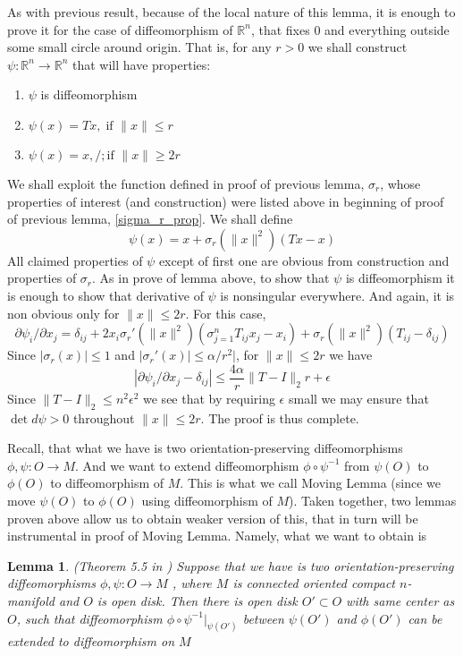 \documentclass[8pt]{article} %
\newcommand{\norm}[1]{\|#1\|}
\newtheorem{lemma}[theorem]{Lemma}
\newenvironment{proof}[1][Proof]{\begin{trivlist}
\item[\hskip \labelsep {\bfseries #1}]}{\qed\end{trivlist}}
\newcommand{\qed}{\nobreak \ifvmode \relax \else
\ifdim\lastskip<1.5em \hskip-\lastskip
\hskip1.5em plus0em minus0.5em \fi \nobreak
  \vrule height0.75em width0.5em depth0.25em\fi}
\begin{document}
\begin{proof}
	As with previous result, because of the local nature of this lemma, it is enough to prove it for the case of diffeomorphism of
	$\mathbb{R}^n$, that fixes $0$ and everything outside some small circle around origin. That is, for any $r>0$ we shall construct
	$\psi:\mathbb{R}^n\rightarrow\mathbb{R}^n$ that will have properties:
	\begin{enumerate}
		\item{$\psi$ is diffeomorphism}
		\item{$\psi(x)=Tx,\;\mbox{if }\norm{x}\leq r$}
		\item{$\psi(x)=x,/;\mbox{if }\norm{x}\geq2r$}
	\end{enumerate}
	We shall exploit the function defined in proof of previous lemma, $\sigma_r$, whose properties of interest (and construction) were listed
	above in beginning of proof of previous lemma, \ref{sigma_r_prop}. We shall define
	\[\psi(x)=x+\sigma_r(\norm{x}^2)(Tx-x)\]
	All claimed properties of $\psi$ except of first one are obvious from construction and properties of $\sigma_r$. As in prove of
	lemma above, to show that $\psi$ is diffeomorphism it is enough to show that derivative of $\psi$ is nonsingular everywhere. And again,
	it is non obvious only for $\norm{x}\leq 2r$. For this case,
	\[\partial \psi_i/\partial x_j=\delta_{ij} +2x_i\sigma_r'(\norm{x}^2)(\sigma_{j=1}^n T_{ij}x_j-x_i)+\sigma_r(\norm{x}^2)(T_{ij}-\delta_{ij})
	\]
	Since $|\sigma_r(x)|\leq 1$ and $|\sigma_r'(x)|\leq \alpha/r^2|$, for $\norm{x}\leq 2r$ we have
	\[|\partial \psi_i/\partial x_j-\delta_{ij}|\leq \frac{4\alpha}{r}\norm{T-I}_2r+\epsilon\]
	Since $\norm{T-I}_2\leq n^2\epsilon^2$ we see that by requiring $\epsilon$ small we may ensure that $\det d\psi>0$ throughout $\norm{x}
	\leq 2r$. The proof is thus complete.
\end{proof}
Recall, that what we have is two orientation-preserving diffeomorphisms $\phi,\psi:O\rightarrow M$. And we want to extend diffeomorphism
$\phi\circ\psi^{-1}$ from $\psi(O)$ to $\phi(O)$ to diffeomorphism of $M$. This is what we call Moving Lemma (since we move $\psi(O)$ to
$\phi(O)$ using diffeomorphism of $M$).
Taken together, two lemmas proven above allow us to obtain weaker version of this, that in turn will be instrumental
in proof of Moving Lemma. Namely,
what we want to obtain is
\begin{lemma}{(Theorem 5.5 in \cite{palaisInner}) }
	\label{InnerLemma}
	Suppose that we have is two orientation-preserving diffeomorphisms $\phi,\psi:O\rightarrow M$
	, where $M$ is connected oriented compact
	$n$-manifold and $O$ is open disk. Then there is open disk $O'\subset O$ with same center as $O$, such that
	diffeomorphism $\phi\circ\psi^{-1}|_{\psi(O')}$ between $\psi(O')$ and $\phi(O')$ can be extended to diffeomorphism on $M$
\end{lemma}
\end{document}
